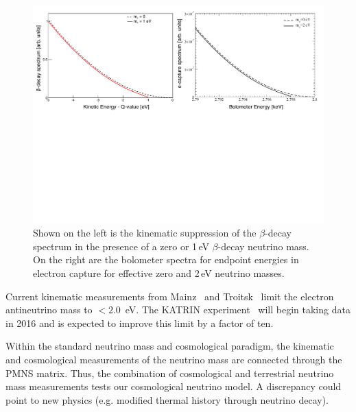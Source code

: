\begin{figure}[h!]
\centering
\includegraphics[width=1.0\textwidth]{Neutrinos/EndpointSpectra}
\caption{Shown on the left is the kinematic suppression of the
  $\beta$-decay spectrum in the presence of a zero or 1\,eV $\beta$-decay
  neutrino mass. On the right are the bolometer spectra for endpoint
  energies in electron capture for effective zero and 2\,eV neutrino
  masses.}
\label{fig:kinematic_mass}
\end{figure}

Current kinematic measurements from Mainz~\cite{Kraus:2004zw} and Troitsk~\cite{Aseev:2011dq} limit the electron antineutrino mass to $< 2.0$~eV. The KATRIN experiment~\cite{Angrik:2005ep} will begin taking data in 2016 and is expected to improve this limit by a factor of ten. 

Within the standard neutrino mass and cosmological paradigm, the kinematic and cosmological measurements of the neutrino mass are connected through the PMNS matrix. Thus, the combination of cosmological and terrestrial neutrino mass measurements tests our cosmological neutrino model. A discrepancy could point to new physics (e.g. modified thermal history through neutrino decay).

